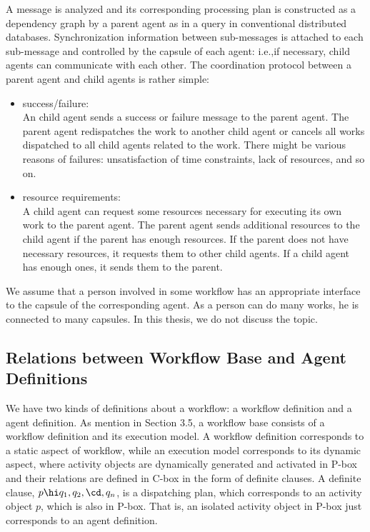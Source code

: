 A message is analyzed and its corresponding processing plan is 
constructed as a dependency graph by a parent agent as in 
a query in conventional distributed databases.
Synchronization information between sub-messages is attached to each
sub-message and controlled by the capsule of each agent: i.e.,if necessary, 
child agents can communicate with each other.
The coordination protocol between a parent agent and child agents
is rather simple:
\begin{itemize}\itemsep0mm
\item success/failure:\\
An child agent sends a success or failure message to the parent agent.
The parent agent redispatches the work to another child agent or cancels
all works dispatched to all child agents related to the work.
There might be various reasons of failures: unsatisfaction of time
constraints, lack of resources, and so on.

\item resource requirements:\\
A child agent can request some resources necessary for executing its
own work to the parent agent.
The parent agent sends additional resources to the child agent if
the parent has enough resources.
If the parent does not have necessary resources, it requests them 
to other child agents.
If a child agent has enough ones, it sends them to the parent.
\end{itemize}

We assume that a person involved in some workflow has an appropriate
interface to the capsule of the corresponding agent.
As a person can do many works, he is connected to many capsules.
In this thesis, we do not discuss the topic.

\subsection{Relations between Workflow Base and Agent Definitions}

We have two kinds of definitions about a workflow: a workflow
definition and a agent definition.
As mention in Section 3.5, a workflow base consists of a workflow 
definition and its execution model.
A workflow definition corresponds to a static aspect of workflow,
while an execution model corresponds to its dynamic aspect, where
activity objects are dynamically generated and activated in P-box and their
relations are defined in C-box in the form of definite clauses.
A definite clause, $p\hi q_1,q_2,\cd,q_n$, is a dispatching plan,
which corresponds to an activity object $p$, which is also in P-box.
That is, an isolated activity object in P-box just corresponds to
an agent definition.

